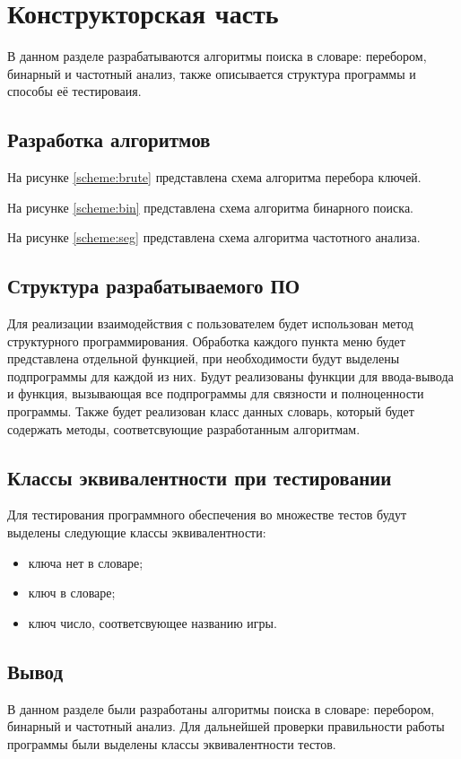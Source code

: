\chapter{Конструкторская часть}

В данном разделе разрабатываются алгоритмы поиска в словаре: перебором,
бинарный и частотный анализ, также описывается структура программы и способы её
тестироваия.

\section{Разработка алгоритмов}

На рисунке \ref{scheme:brute} представлена схема алгоритма перебора ключей.

На рисунке \ref{scheme:bin} представлена схема алгоритма бинарного поиска.

На рисунке \ref{scheme:seg} представлена схема алгоритма частотного анализа.

\noindent
{}
\noindent
{}
\noindent
{}

\section{Структура разрабатываемого ПО}

Для реализации взаимодействия с пользователем будет использован метод
структурного программирования. Обработка каждого пункта меню будет представлена
отдельной функцией, при необходимости будут выделены подпрограммы для каждой из
них. Будут реализованы функции для ввода-вывода и функция, вызывающая все
подпрограммы для связности и полноценности программы. Также будет реализован
класс данных словарь, который будет содержать методы, соответсвующие
разработанным алгоритмам.

\section{Классы эквивалентности при тестировании}

Для тестирования программного обеспечения во множестве тестов будут выделены
следующие классы эквивалентности:
\begin{itemize}[left=\parindent]
    \item ключа нет в словаре;
    \item ключ в словаре;
    \item ключ число, соответсвующее названию игры.
\end{itemize}

\section{Вывод}

В данном разделе были разработаны алгоритмы поиска в словаре: перебором,
бинарный и частотный анализ. Для дальнейшей проверки правильности работы
программы были выделены классы эквивалентности тестов.
